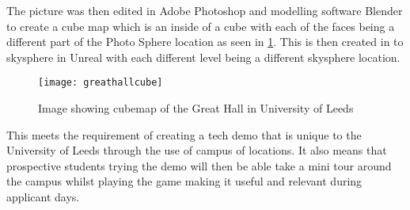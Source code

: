 The picture was then edited in Adobe Photoshop and modelling software Blender to create a cube map which is an inside of a cube with each of the faces being a different part of the Photo Sphere location as seen in \ref{fig:greathallcube}. This is then created in to skysphere in Unreal with each different level being a different skysphere location.

\begin{figure}[h]
	\texttt{[image: greathallcube]}
	\centering
	\caption{Image showing cubemap of the Great Hall in University of Leeds}
	\label{fig:greathallcube}
\end{figure}

This meets the requirement of creating a tech demo that is unique to the University of Leeds through the use of campus of locations. It also means that prospective students trying the demo will then be able take a mini tour around the campus whilst playing the game making it useful and relevant during applicant days.